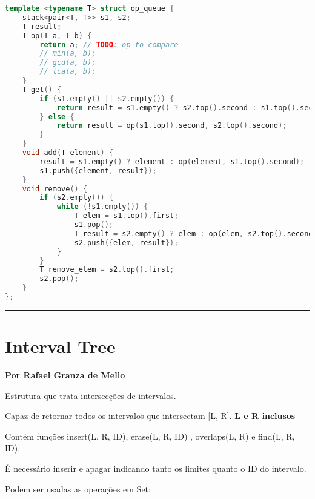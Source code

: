 \documentclass[11pt, a4paper, twoside]{book}
\begin{document}
\hfill

\begin{lstlisting}[language=C++]
template <typename T> struct op_queue {
    stack<pair<T, T>> s1, s2;
    T result;
    T op(T a, T b) {
        return a; // TODO: op to compare
        // min(a, b);
        // gcd(a, b);
        // lca(a, b);
    }
    T get() {
        if (s1.empty() || s2.empty()) {
            return result = s1.empty() ? s2.top().second : s1.top().second;
        } else {
            return result = op(s1.top().second, s2.top().second);
        }
    }
    void add(T element) {
        result = s1.empty() ? element : op(element, s1.top().second);
        s1.push({element, result});
    }
    void remove() {
        if (s2.empty()) {
            while (!s1.empty()) {
                T elem = s1.top().first;
                s1.pop();
                T result = s2.empty() ? elem : op(elem, s2.top().second);
                s2.push({elem, result});
            }
        }
        T remove_elem = s2.top().first;
        s2.pop();
    }
};
\end{lstlisting}

\hfill

\rule{\textwidth}{0.4pt}

\section{Interval Tree}

\textbf{Por Rafael Granza de Mello}



Estrutura que trata intersecções de intervalos.



Capaz de retornar todos os intervalos que intersectam [L, R]. \textbf{L e R inclusos}  

Contém funções insert({L, R, ID}), erase({L, R, ID}) , overlaps(L, R) e find({L, R, ID}).  

É necessário inserir e apagar indicando tanto os limites quanto o ID do intervalo.





Podem ser usadas as operações em Set: 




\hfill
\end{document}

